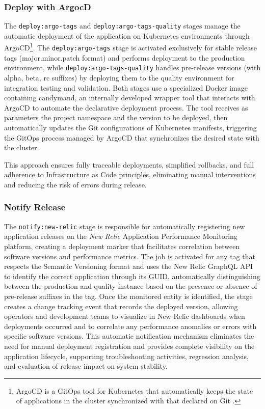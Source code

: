 \subsubsection{Deploy with ArgocD}
The \texttt{deploy:argo-tags} and \texttt{deploy:argo-tags-quality} stages manage the automatic deployment of the application on Kubernetes environments through ArgoCD\footnote{ArgoCD is a GitOps tool for Kubernetes that automatically keeps the state of applications in the cluster synchronized with that declared on Git \cite{argocd}.}. The \texttt{deploy:argo-tags} stage is activated exclusively for stable release tags (major.minor.patch format) and performs deployment to the production environment, while \texttt{deploy:argo-tags-quality} handles pre-release versions (with alpha, beta, rc suffixes) by deploying them to the quality environment for integration testing and validation. Both stages use a specialized Docker image containing candymand, an internally developed wrapper tool that interacts with ArgoCD to automate the declarative deployment process. The tool receives as parameters the project namespace and the version to be deployed, then automatically updates the Git configurations of Kubernetes manifests, triggering the GitOps process managed by ArgoCD that synchronizes the desired state with the cluster. 

This approach ensures fully traceable deployments, simplified rollbacks, and full adherence to Infrastructure as Code principles, eliminating manual interventions and reducing the risk of errors during release.

\subsubsection{Notify Release}
The \texttt{notify:new-relic} stage is responsible for automatically registering new application releases on the \textit{New Relic} Application Performance Monitoring platform, creating a deployment marker that facilitates correlation between software versions and performance metrics. The job is activated for any tag that respects the Semantic Versioning format and uses the New Relic GraphQL API to identify the correct application through its GUID, automatically distinguishing between the production and quality instance based on the presence or absence of pre-release suffixes in the tag. Once the monitored entity is identified, the stage creates a change tracking event that records the deployed version, allowing operators and development teams to visualize in New Relic dashboards when deployments occurred and to correlate any performance anomalies or errors with specific software versions. This automatic notification mechanism eliminates the need for manual deployment registration and provides complete visibility on the application lifecycle, supporting troubleshooting activities, regression analysis, and evaluation of release impact on system stability.

